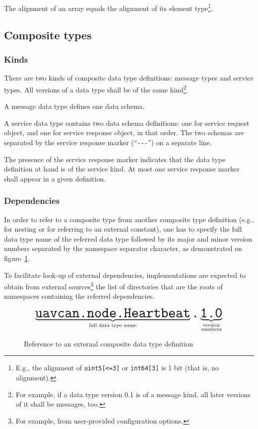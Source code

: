 The alignment of an array equals the alignment of its element type\footnote{
    E.g., the alignment of \texttt{uint5[<=3]} or \texttt{int64[3]} is 1 bit (that is, no alignment).
}.

\subsection{Composite types}\label{sec:dsdl_composite_types}

\subsubsection{Kinds}

There are two kinds of composite data type definitions: message types and service types.
All versions of a data type shall be of the same kind\footnote{%
    For example, if a data type version 0.1 is of a message kind, all later versions of it shall be messages, too.
}.

A message data type defines one data schema.

A service data type contains two data schema definitions:
one for service request object, and one for service response object, in that order.
The two schemas are separated by the service response marker (``\verb|---|'') on a separate line.

The presence of the service response marker indicates that the data type definition at hand is of the service kind.
At most one service response marker shall appear in a given definition.

\subsubsection{Dependencies}

In order to refer to a composite type from another composite type definition
(e.g., for nesting or for referring to an external constant),
one has to specify the full data type name of the referred data type followed by its
major and minor version numbers separated by the namespace separator character,
as demonstrated on figure~\ref{fig:dsdl_nested_reference}.

To facilitate look-up of external dependencies,
implementations are expected to obtain from external sources\footnote{%
    For example, from user-provided configuration options.
} the list of directories that are the roots of namespaces containing the referred dependencies.

\begin{figure}[H]
    $$
    \underbrace{\texttt{\huge{uavcan.node.Heartbeat}}}_{\text{full data type name}}%
    \texttt{\huge{.}}%
    \underbrace{\texttt{\huge{1.0}}}_{\substack{\text{version} \\ \text{numbers}}}%
    $$
    \caption{Reference to an external composite data type definition\label{fig:dsdl_nested_reference}}
\end{figure}

